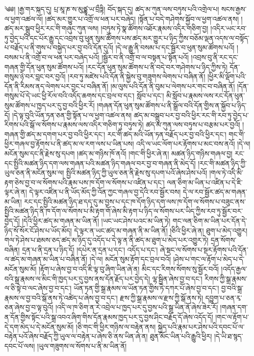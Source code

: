 \setcounter{footnote}{0} 
༄༅། །རྒྱ་གར་སྐད་དུ། པྲ་མཱ་ཎ་ས་མུཙྪཱ་ཡ་བྲྀཏྟི། བོད་སྐད་དུ། ཚད་མ་ཀུན་ལས་བཏུས་པའི་འགྲེལ་པ། སངས་རྒྱས་ལ་ཕྱག་འཚལ་ལོ། །ཚད་མར་གྱུར་པ་འགྲོ་ལ་ཕན་པར་བཞེད། །སྟོན་པ་བདེ་གཤེགས་སྐྱོབ་ལ་ཕྱག་འཚལ་ནས། །ཚད་མར་སྒྲུབ་ཕྱིར་རང་གི་གཞུང་ཀུན་ལས། །བཏུས་ཏེ་སྣ་ཚོགས་འཐོར་རྣམས་འདིར་གཅིག་བྱ། །འདིར་ཡང་རབ་ཏུ་བྱེད་པའི་དང་པོར་རྒྱུ་དང་འབྲས་བུ་ཕུན་སུམ་ཚོགས་པས་ཚད་མར་གྱུར་པ་ཉིད་ཀྱིས་བཅོམ་ལྡན་འདས་ལ་བསྟོད་པ་བརྗོད་པ་ནི་གུས་པ་བསྐྱེད་པར་བྱ་བའི་དོན་དུའོ། །དེ་ལ་རྒྱུ་ནི་བསམ་པ་དང་སྦྱོར་བ་ཕུན་སུམ་ཚོགས་པའོ། །བསམ་པ་ནི་འགྲོ་བ་ལ་ཕན་པར་བཞེད་པའོ། །སྦྱོར་བ་ནི་འགྲོ་བ་ལ་བསྟན་པ་སྟོན་པའོ། །འབྲས་བུ་ནི་རང་དང་གཞན་གྱི་དོན་ཕུན་སུམ་ཚོགས་པའོ། །རང་དོན་ཕུན་སུམ་ཚོགས་པ་ནི་བདེ་བར་གཤེགས་པ་ཉིད་ཀྱིས་ཏེ། དོན་གསུམ་ཉེ་བར་བླང་བར་བྱའོ། །རབ་ཏུ་མཛེས་པའི་དོན་ནི་སྐྱེས་བུ་གཟུགས་ལེགས་པ་བཞིན་ནོ། །ཕྱིར་མི་ལྡོག་པའི་དོན་ནི་རིམས་ནད་ལེགས་པར་བྱང་པ་བཞིན་ནོ། །མ་ལུས་པའི་དོན་ནི་བུམ་པ་ལེགས་པར་གང་བ་བཞིན་ནོ། །དོན་གསུམ་པོ་དེ་ཡང་ཕྱི་རོལ་བའི་འདོད་ཆགས་དང་བྲལ་བ་དང་། སློབ་པ་དང་། མི་སློབ་པ་རྣམས་ལས་རང་དོན་ཕུན་སུམ་ཚོགས་པ་ཁྱད་པར་དུ་བྱ་བའི་ཕྱིར་རོ། །གཞན་དོན་ཕུན་སུམ་ཚོགས་པ་ནི་སྒྲོལ་བའི་དོན་གྱིས་ན་སྐྱོབ་པ་ཉིད་དོ། །དེ་ལྟ་བུའི་ཡོན་ཏན་ཅན་གྱི་སྟོན་པ་ལ་ཕྱག་འཚལ་ནས། ཚད་མ་བསྒྲུབ་པར་བྱ་བའི་ཕྱིར་རང་གི་རབ་ཏུ་བྱེད་པ་རིགས་པའི་སྒོ་ལ་སོགས་པ་རྣམས་ལས་འདིར་གཅིག་ཏུ་བཏུས་ཏེ། ཚད་མ་ཀུན་ལས་བཏུས་པ་བརྩམ་པར་བྱའོ། །གཞན་གྱི་ཚད་མ་དགག་པར་བྱ་བའི་ཕྱིར་དང་། རང་གི་ཚད་མའི་ཡོན་ཏན་བརྗོད་པར་བྱ་བའི་ཕྱིར་དང་། གང་གི་ཕྱིར་གཞལ་བྱ་རྟོགས་པ་ནི་ཚད་མ་ལ་རག་ལས་པ་ཡིན་པས། འདི་ལ་ཡང་ལོག་པར་རྟོགས་པ་མང་བས་ནའོ། །དེ་ལ། མངོན་སུམ་དང་ནི་རྗེས་སུ་དཔག །ཚད་མ་གཉིས་ཁོ་ནའོ། །གང་གི་ཕྱིར་ཞེ་ན། མཚན་ཉིད་གཉིས་གཞལ་བྱ། རང་དང་སྤྱིའི་མཚན་ཉིད་དག་ལས་གཞན་པའི་མཚན་ཉིད་གཞལ་བར་བྱ་བ་གཞན་ནི་མེད་དོ། །རང་གི་མཚན་ཉིད་ཀྱི་ཡུལ་ཅན་ནི་མངོན་སུམ་ལ། སྤྱིའི་མཚན་ཉིད་ཀྱི་ཡུལ་ཅན་ནི་རྗེས་སུ་དཔག་པའོ་ཞེས་ཤེས་པའོ། །གལ་ཏེ་འདི་མི་རྟག་ཅེས་བྱ་བ་ལ་སོགས་པའི་རྣམ་པས་ཁ་དོག་ལ་སོགས་པ་འཛིན་པ་དང་། ལན་ཅིག་མ་ཡིན་པ་འཛིན་པ་དེ་ཇི་ལྟར་ཞེ་ན། དེ་ལྟར་འཛིན་པ་ནི་ཡོད་མོད་ཀྱི་འོན་ཀྱང་གཞལ་བྱ་དེའི་རབ་སྦྱོར་བས། དེ་ལ་རབ་སྦྱོར་ཚད་མ་གཞན་མ་ཡིན། རང་དང་སྤྱིའི་མཚན་ཉིད་ཐ་དད་དུ་མ་བྱས་པ་དང་ཁ་དོག་ཉིད་དག་ལས་ཁ་དོག་ལ་སོགས་པ་བཟུང་ནས་སྤྱིའི་མཚན་ཉིད་ནི་ཁ་དོག་ལ་སོགས་པ་མི་རྟག་གོ་ཞེས་མི་རྟག་པ་ཉིད་ལ་སོགས་པར་ཡིད་ཀྱིས་རབ་ཏུ་སྦྱོར་བར་བྱེད་དོ། །དེའི་ཕྱིར་ཚད་མ་གཞན་མ་ཡིན་ནོ། །ཡང་ཡང་ཤེས་པའང་མ་ཡིན་ཏེ། གང་ལན་ཅིག་མ་ཡིན་པར་དོན་དེ་ཉིད་སོ་སོར་ངོ་ཤེས་པ་ཡོད་མོད། དེ་ལྟར་ན་ཡང་ཚད་མ་གཞན་ནི་མ་ཡིན་ནོ། །ཅིའི་ཕྱིར་ཞེ་ན། ཐུག་པ་མེད་འགྱུར། གལ་ཏེ་ཤེས་པ་ཐམས་ཅད་ཚད་མ་ཉིད་དུ་འདོད་པ་དེ་ལྟ་ན་ནི་ཚད་མ་ཐུག་པ་མེད་པར་འགྱུར་ཏེ། དྲན་སོགས་བཞིན། དྲན་པ་ནི་དྲན་པ་ཉིད་དོ། །དཔེར་ན་དྲན་པ་དང་། འདོད་པ་དང་། ཞེ་སྡང་ལ་སོགས་པ་སྔར་རྟོགས་པའི་དོན་ལ་ཚད་མ་གཞན་མ་ཡིན་པ་བཞིན་ནོ། །དེ་ལ། མངོན་སུམ་རྟོག་དང་བྲལ་བའོ། །ཤེས་པ་གང་ལ་རྟོག་པ་མེད་པ་དེ་མངོན་སུམ་མོ། །རྟོག་པ་ཞེས་བྱ་བ་འདི་ཇི་ལྟ་བུ་ཞིག་ཡིན་ཞེ་ན། མིང་དང་རིགས་སོགས་སུ་སྦྱོར་བའོ། །འདོད་རྒྱལ་བའི་སྒྲ་རྣམས་ལ་མིང་གི་ཁྱད་པར་དུ་བྱས་ནས་དོན་རྗོད་པར་བྱེད་དེ། ལྷ་སྦྱིན་ཞེས་བྱ་བ་དང་། རིགས་ཀྱི་སྒྲ་རྣམས་ལ་ཅི་སྟེ་བ་ལང་ཞེས་བྱ་བ་དང་། ཡོན་ཏན་གྱི་སྒྲ་རྣམས་ལ་ཡོན་ཏན་གྱིས་ཏེ་དཀར་པོ་ཞེས་བྱ་བ་དང་། བྱ་བའི་སྒྲ་རྣམས་ལ་བྱ་བའི་སྒོ་ནས་ཏེ་འཚེད་པ་ཞེས་བྱ་བ་དང་། རྫས་ཀྱི་སྒྲ་རྣམས་ལ་རྫས་ཀྱི་སྒོ་ནས་ཏེ། དབྱུག་པ་ཅན་རྭ་ཅན་ཞེས་བྱ་བ་ལྟ་བུའོ། །འདི་ལ་ཁ་ཅིག་ན་རེ་འབྲེལ་པ་ཁྱད་པར་དུ་བྱས་པའི་སྒྲ་ཡིན་ནོ་ཞེས་ཟེར་རོ། །གཞན་དག་ན་དོན་གྱིས་སྟོང་པའི་སྒྲ་འབའ་ཞིག་གིས་དོན་རྣམས་ཁྱད་པར་དུ་བྱས་ཤིང་བརྗོད་དོ་ཞེས་འདོད་དོ། །གང་ལ་རྟོག་པ་དེ་དག་མེད་པ་དེ་མངོན་སུམ་མོ། །ཅི་གང་གི་ཕྱིར་གཉིས་ལ་བརྟེན་ནས། སྐྱེད་པའི་རྣམ་པར་ཤེས་པའི་དབང་པོ་ལ་བརྟེན་པའོ་ཞེས་བརྗོད་ཀྱི་ཡུལ་ལ་བརྟེན་པ་ཞེས་ཅི་ནས་ཡིན་ཞེ་ན། ཐུན་མོང་ཡིན་པའི་རྒྱུའི་ཕྱིར། །དེ་ཡི་ཐ་སྙད་དབང་པོ་ལས། །ཡུལ་གཟུགས་ལ་སོགས་པ་ནི་མ་ཡིན་ནོ། 
